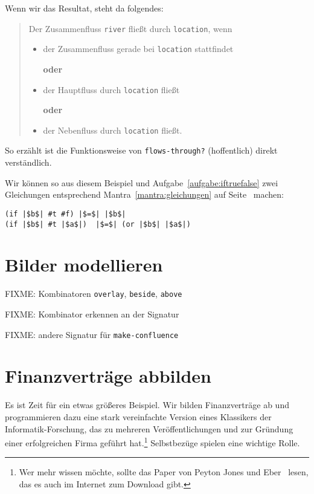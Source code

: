 %
Wenn wir das Resultat, steht da folgendes:
%
\begin{quote}
  Der Zusammenfluss \lstinline{river} fließt durch
  \lstinline{location}, wenn

  \begin{itemize}
  \item der Zusammenfluss gerade bei \lstinline{location} stattfindet

    \centerline{\textbf{oder}}
  \item der Hauptfluss durch \lstinline{location} fließt

    \centerline{\textbf{oder}}
  \item der Nebenfluss durch \lstinline{location} fließt.
  \end{itemize}
\end{quote}
%
So erzählt ist die Funktionsweise von \lstinline{flows-through?}
(hoffentlich) direkt verständlich.

Wir können so aus diesem Beispiel und
Aufgabe~\ref{aufgabe:iftruefalse} zwei Gleichungen entsprechend
Mantra~\ref{mantra:gleichungen} auf Seite~\pageref{mantra:gleichungen}
machen:
%
\begin{lstlisting}
(if |$b$| #t #f) |$=$| |$b$|
(if |$b$| #t |$a$|)  |$=$| (or |$b$| |$a$|)
\end{lstlisting}
%

\section{Bilder modellieren}

FIXME: Kombinatoren \texttt{overlay}, \texttt{beside}, \texttt{above}


FIXME: Kombinator erkennen an der Signatur

FIXME: andere Signatur für \texttt{make-confluence}

\section{Finanzverträge abbilden}

Es ist Zeit für ein etwas größeres Beispiel.  Wir bilden
Finanzverträge ab und programmieren dazu eine stark vereinfachte
Version eines Klassikers der Informatik-Forschung, das zu mehreren
Veröffentlichungen und zur Gründung einer erfolgreichen Firma geführt
hat.\footnote{Wer mehr wissen möchte, sollte das Paper von Peyton
  Jones und Eber~\cite{FinancialContracts} lesen, das es auch im
  Internet zum Download gibt.}  Selbstbezüge spielen eine wichtige
Rolle.

